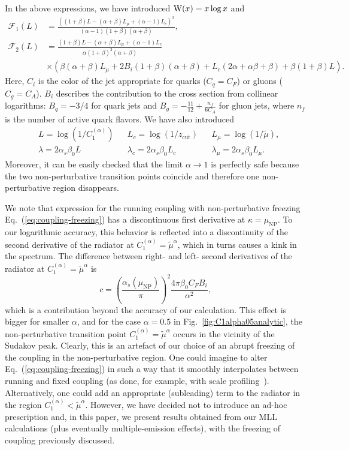 \documentclass[letterpaper,11pt]{article}
\newcommand{\mut}{\tilde\mu}
\newcommand{\xlog}{{\rm W}}
\newcommand{\as}{\alpha_s}
\newcommand{\C}[2]{C^{(#2)}_{#1}}
\newcommand{\zcut}{z_\text{cut}}
\newcommand{\ea}{{\C{1}{\alpha}}}
\DeclareRobustCommand{\Fig}[1]{Fig.~\ref{#1}}
\DeclareRobustCommand{\Eq}[1]{Eq.~(\ref{#1})}
\begin{document}
In the above expressions, we have introduced $\xlog(x) = x\log x$ and
\begin{align}
\mathcal{F}_1(L)&= \frac{((1+\beta) L-(\alpha+\beta)L_\mu+(\alpha-1) L_c)^2}{(\alpha-1) (1+\beta) (\alpha+\beta)}, \\
\mathcal{F}_2(L)&=  \frac{(1+\beta) L-(\alpha+\beta)L_\mu+(\alpha-1) L_c}{\alpha (1+\beta)^2 (\alpha+\beta)} 
\\ \nonumber &\times
\left( \beta \left(\alpha+\beta\right) L_\mu +2 B_i(1+\beta) (\alpha+\beta)+L_c ( 2 \alpha+
   \alpha \beta+\beta)+\beta \left(1+\beta\right) L \right).
\end{align}
Here, $C_i$ is the color of the jet appropriate for quarks ($C_q = C_F$) or gluons ($C_g = C_A$).  $B_i$ describes the contribution to the cross section from collinear logarithms: $B_q = -3/4$ for quark jets and $B_g = -\frac{11}{12}+\frac{n_f}{6C_A} $ for gluon jets, where  $n_f$ is the number of active quark flavors.
We have also introduced
\begin{align} \label{log-refs}
&L=\log(1/\ea) && L_c=\log(1/\zcut) && L_\mu=\log(1/\mut),\\
&\lambda=2\alpha_s \beta_0 L && \lambda_c=2\alpha_s \beta_0 L_c && \lambda_\mu=2\alpha_s \beta_0 L_\mu.
\end{align}
Moreover, it can be easily checked that the limit $\alpha\to 1$ is perfectly safe because the two non-perturbative transition points coincide and therefore one non-perturbative region disappears. 

We note that expression for the running coupling with non-perturbative freezing \Eq{eq:coupling-freezing} has a discontinuous first derivative at $\kappa=\mu_\text{NP}$. To our logarithmic accuracy, this behavior is reflected into a discontinuity of the second derivative of the radiator at $\ea=\tilde{\mu}^\alpha$, which in turns causes a kink in the spectrum.
The difference between right- and left- second derivatives of the radiator at $\ea=\tilde{\mu}^\alpha$ is
\begin{equation}\label{eq:NP-disc}
c=\left( \frac{\as(\mu_\text{NP})}{\pi}\right)^2 \frac{4 \pi \beta_0 C_F B_i}{\alpha^2},
\end{equation}
which is a contribution beyond the accuracy of our calculation.
This effect is bigger for smaller $\alpha$, and for the case $\alpha=0.5$ in \Fig{fig:C1alpha05analytic}, the non-perturbative transition point $\ea=\tilde{\mu}^\alpha$ occurs in the vicinity of the Sudakov peak. Clearly, this is an artefact of our choice of an abrupt freezing of the coupling in the non-perturbative region. One could imagine to alter \Eq{eq:coupling-freezing} in such a way that it smoothly interpolates between running and fixed coupling (as done, for example, with scale profiling~\cite{Abbate:2010xh}). Alternatively, one could add an appropriate (subleading) term to the radiator in the region $\ea<\tilde{\mu}^\alpha$. However, we have decided not to introduce an ad-hoc prescription and, in this paper, we present results obtained from our MLL calculations (plus eventually multiple-emission effects), with the freezing of coupling previously discussed.
\end{document}
